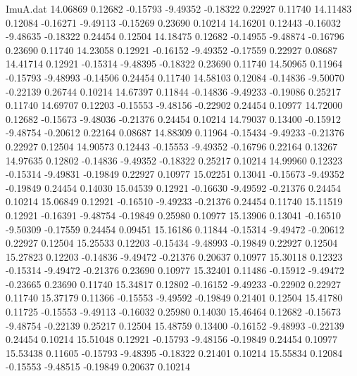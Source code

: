 \begin{filecontents}{ImuA.dat}
  14.06869    0.12682   -0.15793   -9.49352   -0.18322    0.22927    0.11740
  14.11483    0.12084   -0.16271   -9.49113   -0.15269    0.23690    0.10214
  14.16201    0.12443   -0.16032   -9.48635   -0.18322    0.24454    0.12504
  14.18475    0.12682   -0.14955   -9.48874   -0.16796    0.23690    0.11740
  14.23058    0.12921   -0.16152   -9.49352   -0.17559    0.22927    0.08687
  14.41714    0.12921   -0.15314   -9.48395   -0.18322    0.23690    0.11740
  14.50965    0.11964   -0.15793   -9.48993   -0.14506    0.24454    0.11740
  14.58103    0.12084   -0.14836   -9.50070   -0.22139    0.26744    0.10214
  14.67397    0.11844   -0.14836   -9.49233   -0.19086    0.25217    0.11740
  14.69707    0.12203   -0.15553   -9.48156   -0.22902    0.24454    0.10977
  14.72000    0.12682   -0.15673   -9.48036   -0.21376    0.24454    0.10214
  14.79037    0.13400   -0.15912   -9.48754   -0.20612    0.22164    0.08687
  14.88309    0.11964   -0.15434   -9.49233   -0.21376    0.22927    0.12504
  14.90573    0.12443   -0.15553   -9.49352   -0.16796    0.22164    0.13267
  14.97635    0.12802   -0.14836   -9.49352   -0.18322    0.25217    0.10214
  14.99960    0.12323   -0.15314   -9.49831   -0.19849    0.22927    0.10977
  15.02251    0.13041   -0.15673   -9.49352   -0.19849    0.24454    0.14030
  15.04539    0.12921   -0.16630   -9.49592   -0.21376    0.24454    0.10214
  15.06849    0.12921   -0.16510   -9.49233   -0.21376    0.24454    0.11740
  15.11519    0.12921   -0.16391   -9.48754   -0.19849    0.25980    0.10977
  15.13906    0.13041   -0.16510   -9.50309   -0.17559    0.24454    0.09451
  15.16186    0.11844   -0.15314   -9.49472   -0.20612    0.22927    0.12504
  15.25533    0.12203   -0.15434   -9.48993   -0.19849    0.22927    0.12504
  15.27823    0.12203   -0.14836   -9.49472   -0.21376    0.20637    0.10977
  15.30118    0.12323   -0.15314   -9.49472   -0.21376    0.23690    0.10977
  15.32401    0.11486   -0.15912   -9.49472   -0.23665    0.23690    0.11740
  15.34817    0.12802   -0.16152   -9.49233   -0.22902    0.22927    0.11740
  15.37179    0.11366   -0.15553   -9.49592   -0.19849    0.21401    0.12504
  15.41780    0.11725   -0.15553   -9.49113   -0.16032    0.25980    0.14030
  15.46464    0.12682   -0.15673   -9.48754   -0.22139    0.25217    0.12504
  15.48759    0.13400   -0.16152   -9.48993   -0.22139    0.24454    0.10214
  15.51048    0.12921   -0.15793   -9.48156   -0.19849    0.24454    0.10977
  15.53438    0.11605   -0.15793   -9.48395   -0.18322    0.21401    0.10214
  15.55834    0.12084   -0.15553   -9.48515   -0.19849    0.20637    0.10214

\end{filecontents}
